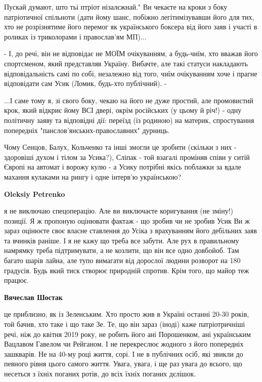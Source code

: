 \begin{itemize}
\begin{itemize}
Пускай думают, што тьі птріот нізалєжнай." Ви чекаєте на кроки з боку
патріотичної спільноти (дати йому шанс, побіжно легітимізувавши його для тих,
хто не розрізнятиме його перемог як українського боксера від його заяв і участі
в роликах із триколорами і православ'ям МП)...

- І, до речі, він не відповідає не МОЇМ очікуванням, а будь-чиїм, хто вважав
його спортсменом, який представляв Україну. Вибачте, але такі статуси
накладають відповідальність самі по собі, незалежно від того, чиїм очікуванням
хоче і прагне відповідати сам Усик (Ломик, будь-хто публічний). -

...І саме тому я, зі свого боку, чекаю на його не дуже простий, але промовистий
крок, який відкриє йому ВСІ двері, окрім російських (у цьому й річ!) - одну
політичну заяву та відповідні дії: переїзд (із родиною) на материк,
спростування попередніх "панслов'янських-православних" дурниць.

Чому Сенцов, Балух, Кольченко та інші змогли це зробити (скільки з них -
здоровіші духом і тілом за Усика?), Сліпак - той взагалі проміняв співи у ситій
Європі на автомат і ворожу кулю - а Усику потрібні якісь поблажки за вдале
махання кулаками на рингу і одне інтерв'ю українською?

\textbf{Oleksiy Petrenko} 

\obeycr
я не виключаю спецоперацію. Але ви виключаєте коригування (не зміну!) позиції.
Я ж пропоную оцінювати фактаж - що зробив чи не зробив Усик
Ви ж зараз оцінюєте своє власне ставлення до Усіка з врахуванням його дебільних заяв та вчинків раніше.
І я не кажу що треба все забути. Але рух в правильному намрямку треба підтримувати, а не козлити, що він все одно довбойоб.
Там багато шарів лайна, але тупо вимагати від дорослої людини розворот на 180 градусів. Будь який тиск створює природній спротив.
Крім того, що майор теж працює.
\restorecr

\textbf{Вячеслав Шостак} 

це приблизно, як із Зеленським. Хто просто жив в Україні останні 20-30 років,
той бачив, хто таке і що таке Зе. Те, що він зараз (іноді) каже патріотричніші
речі, ніж до квітня 2019 року, не робить його ані Порошенком, ані українським
Вацлавом Гавелом чи Рейганом. І не перекреслює жодного з його попередніх
зашкварів. Не на 40-му році життя, сорі. І не в публічних осіб, які звикли до
певного рівня цього самого життя. Увага, увага, і ще раз увага до всього, що
несеться з їхніх поганих ротів, до всіх їхніх поганих дєлішок.


\end{itemize}
\end{itemize}
